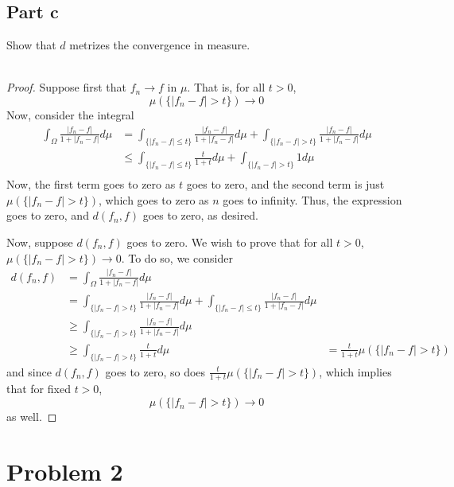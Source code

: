 \documentclass[fontsize=11pt]{scrartcl} %
\numberwithin{equation}{section} %
\numberwithin{figure}{section} %
\numberwithin{table}{section} %
\begin{document}
\subsection*{Part c}
Show that $d$ metrizes the convergence in measure.
\\
\\
\begin{proof}
Suppose first that $f_n\to f$ in $\mu$. That is, for all $t>0$,
    \[
        \mu(\{|f_n-f|>t\})\to 0
    \]
    Now, consider the integral
    \[
        \begin{aligned}
            \int_{\Omega}\frac{|f_n-f|}{1+|f_n-f|}d\mu
            &= \int_{\{|f_n-f|\leq t\}}\frac{|f_n-f|}{1+|f_n-f|}d\mu +
            \int_{\{|f_n-f|>t\}}\frac{|f_n-f|}{1+|f_n-f|}d\mu\\
            &\leq \int_{\{|f_n-f|\leq t\}}\frac{t}{1+t}d\mu +
            \int_{\{|f_n-f|>t\}}1d\mu\\
        \end{aligned}
    \]
    Now, the first term goes to zero as $t$ goes to zero, and the second term
    is just $\mu(\{|f_n-f|>t\})$, which goes to zero as $n$ goes to infinity.
    Thus, the expression goes to zero, and $d(f_n,f)$ goes to zero, as desired.

    Now, suppose $d(f_n,f)$ goes to zero. We wish to prove that for all $t>0$,
    $\mu(\{|f_n-f| > t\})\to 0$. To do so, we consider
    \[
        \begin{aligned}
            d(f_n,f) &= \int_{\Omega}\frac{|f_n-f|}{1+|f_n-f|}d\mu\\
            &= \int_{\{|f_n-f|>t\}}\frac{|f_n-f|}{1+|f_n-f|}d\mu +
                \int_{\{|f_n-f|\leq t\}}\frac{|f_n-f|}{1+|f_n-f|}d\mu\\
            &\geq\int_{\{|f_n-f|>t\}}\frac{|f_n-f|}{1+|f_n-f|}d\mu\\
            &\geq\int_{\{|f_n-f|>t\}}\frac{t}{1+t}d\mu
            &=\frac{t}{1+t}\mu(\{|f_n-f|>t\})
        \end{aligned}
    \]
    and since $d(f_n,f)$ goes to zero, so does
    $\frac{t}{1+t}\mu(\{|f_n-f|>t\})$, which implies that for fixed $t>0$,
    \[
        \mu(\{|f_n-f|>t\})\to 0
    \]
    as well.
\end{proof}

\section*{Problem 2}
\end{document}
